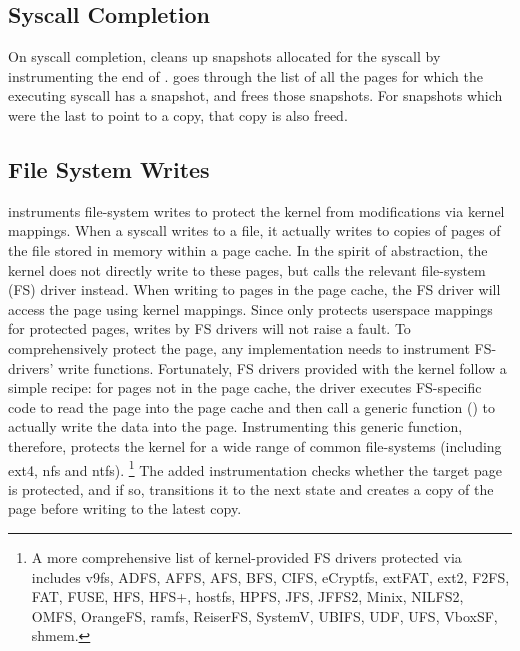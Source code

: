 \documentclass[letterpaper,twocolumn,10pt, anonymous]{article}
\begin{document}
\subsection{Syscall Completion}

On syscall completion, \tiktok cleans up snapshots allocated for 
the syscall by instrumenting the end of .
\tiktok goes through the list of all the pages for which the 
executing syscall has a snapshot, and frees those snapshots.
For snapshots which were the last to point to a copy, that 
copy is also freed.


\subsection{File System Writes}

\tiktok instruments file-system writes to protect the kernel
from modifications via kernel mappings.
When a  syscall writes to a file, it actually
writes to copies of pages of the file stored in memory within 
a page cache.
In the spirit of abstraction, the kernel does not directly write to 
these pages, but calls the relevant file-system (FS) driver instead.
When writing to pages in the page cache, the FS driver will access the 
page using kernel mappings.
Since \tiktok only protects userspace mappings for protected pages, 
writes by FS drivers will not raise a fault.
To comprehensively protect the page, any implementation needs to 
instrument FS-drivers' write functions.
Fortunately, FS drivers provided with the kernel follow a simple 
recipe: for pages not in the page cache, the driver executes 
FS-specific code to read the page into the page cache and then 
call a generic function () to actually 
write the data into the page.
Instrumenting this generic function, therefore, protects the kernel
for a wide range of common file-systems (including ext4, nfs and 
ntfs). \footnote{A more comprehensive list of kernel-provided FS drivers 
protected via  includes v9fs, ADFS, AFFS, 
AFS, BFS, CIFS, eCryptfs, extFAT, ext2, F2FS,  FAT, FUSE, HFS, HFS+, 
hostfs, HPFS, JFS, JFFS2, Minix, NILFS2, OMFS, OrangeFS, ramfs, ReiserFS,
SystemV, UBIFS, UDF, UFS, VboxSF, shmem.}
The added instrumentation checks whether the target page is 
protected, and if so, transitions it to the next state and 
creates a copy of the page before writing to the latest copy.
\end{document}
